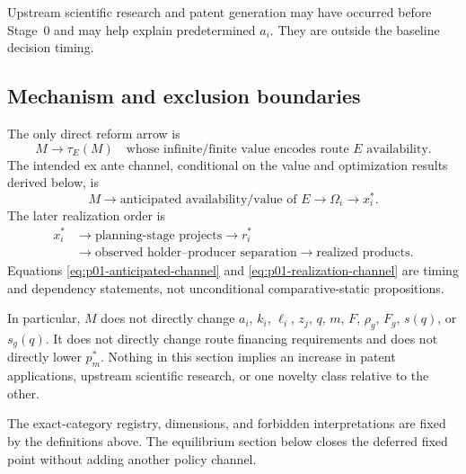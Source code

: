 Upstream scientific research and patent generation may have occurred before
Stage~0 and may help explain predetermined \(a_i\).  They are outside the
baseline decision timing.

\subsection{Mechanism and exclusion boundaries}
\label{subsec:p01-mechanism-boundary}

The only direct reform arrow is
\begin{equation}
  M\longrightarrow \tau_E(M)
  \quad\text{whose infinite/finite value encodes route }E\text{ availability}.
  \label{eq:p01-only-direct-policy-arrow}
\end{equation}
The intended ex ante channel, conditional on the value and optimization results
derived below, is
\begin{equation}
  M
  \longrightarrow
  \text{anticipated availability/value of }E
  \longrightarrow
  \Omega_i
  \longrightarrow
  x_i^*.
  \label{eq:p01-anticipated-channel}
\end{equation}
The later realization order is
\begin{equation}
  \begin{aligned}
    x_i^*
    &\longrightarrow
    \text{planning-stage projects}
    \longrightarrow r_i^* \\
    &\longrightarrow
    \text{observed holder--producer separation}
    \longrightarrow
    \text{realized products}.
  \end{aligned}
  \label{eq:p01-realization-channel}
\end{equation}
Equations \eqref{eq:p01-anticipated-channel} and
\eqref{eq:p01-realization-channel} are timing and dependency statements, not
unconditional comparative-static propositions.

In particular, \(M\) does not directly change \(a_i\), \(k_i\), \(\ell_i\), \(z_j\),
\(q\), \(m\), \(F\), \(\rho_g\), \(F_g\), \(s(q)\), or \(s_g(q)\).  It does
not directly change route financing requirements and does not directly lower
\(p_m^*\). Nothing in this section implies an increase in
patent applications, upstream scientific research, or one novelty class
relative to the other.

The exact-category registry, dimensions, and forbidden interpretations are
fixed by the definitions above.  The equilibrium section below closes the
deferred fixed point without adding another policy channel.
